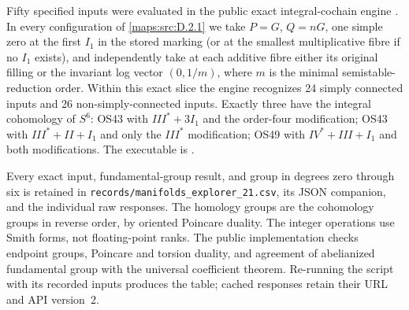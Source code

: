 \begin{computed}\label{maps:src:D.2.2}


Fifty specified inputs were evaluated in the public exact integral-cochain engine
\cite{manExplorer26}. In every configuration of \ref{maps:src:D.2.1} we take
$P=G$, $Q=nG$, one simple zero at the first $I_1$ in the stored
marking (or at the smallest multiplicative fibre if no $I_1$ exists),
and independently take at each additive fibre either its original
filling or the invariant log vector $(0,1/m)$, where $m$ is the
minimal semistable-reduction order. Within this exact slice the
engine recognizes 24 simply connected inputs and 26 non-simply-connected
inputs. Exactly three have the integral cohomology of $S^6$:
OS43 with $III^*+3I_1$ and the order-four modification;
OS43 with $III^*+II+I_1$ and only the $III^*$ modification;
OS49 with $IV^*+III+I_1$ and both modifications. The executable is
.

Every exact input, fundamental-group result, and group in degrees
zero through six is retained in
\texttt{records/manifolds\_explorer\_21.csv}, its JSON companion,
and the individual raw responses. The homology groups are the
cohomology groups in reverse order, by oriented Poincare duality.
The integer operations use Smith forms, not floating-point ranks.
The public implementation checks endpoint groups, Poincare and
torsion duality, and agreement of abelianized fundamental group
with the universal coefficient theorem. Re-running the script
with its recorded inputs produces the table; cached responses
retain their URL and API version~2.


\end{computed}
